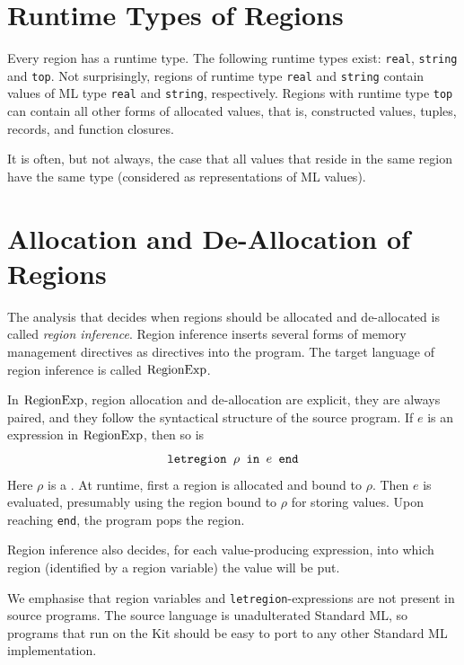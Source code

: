 \documentclass[12pt]{book}
\begin{document}
\section{Runtime Types of Regions}
\label{runtimetypes.sec}
Every region has a runtime type. The following
runtime types exist: {\tt real}, {\tt string} and {\tt top}. Not
surprisingly, regions of runtime type {\tt real} and {\tt string}
contain values of ML type {\tt real} and {\tt string}, respectively.
Regions with runtime type {\tt top} can contain all other forms of
allocated values, that is, constructed values, tuples, records, and
function closures.

It is often, but not always, the case that all values that reside in the
same region have the same type (considered as representations of ML values).
 
\section{Allocation and De-Allocation of Regions}
\label{aldeal.sec}
The analysis that decides when regions should be allocated and de-allocated
is called {\em region inference}. Region inference inserts 
several forms of memory management directives
as directives into the program.
The target language of region inference is called $\hbox{\rm RegionExp}$.

In $\hbox{\rm RegionExp}$, 
region allocation and de-allocation are explicit, they are always paired,
and they follow
the syntactical structure of the source program. 
If $e$ is an expression in $\hbox{\rm RegionExp}$, then so is
$$\hbox{\tt letregion $\rho$ in $e$ end}$$
Here $\rho$ is a . At runtime, first a region
is allocated and bound to $\rho$. Then $e$ is evaluated, presumably using
the region bound to $\rho$ for storing values. Upon reaching {\tt end}, the program pops the
region.

Region inference also decides, for each value-producing expression, 
into which region (identified by a region variable) the value will be put.

We emphasise that region variables and {\tt letregion}-expressions are
not present in source programs. The source language is unadulterated
Standard ML, so programs  that run on the Kit should be easy to port to any 
other Standard ML implementation.

\end{document}
